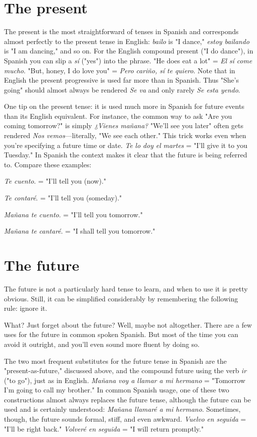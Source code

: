 \documentclass[14pt,a4paper,oneside]{memoir}
\newcommand{\bsk}{\vspace{20pt}}
\newcommand{\indu}{\hspace{20pt}}
\begin{document}
\section{The present}

The present is the most straightforward of tenses in Spanish
and corresponds almost perfectly to the present tense in English: \emph{bailo}
is "I dance," \emph{estoy bailando} is "I am dancing," and so on. For the English compound present ("I do dance"), in Spanish you can slip a \emph{sí}
("yes") into the phrase. "He does eat a lot" = \emph{El sí come mucho}. "But,
honey, I do love you" = \emph{Pero cariño, sí te quiero}. Note that in English
the present progressive is used far more than in Spanish. Thus "She's
going" should almost always be rendered \emph{Se va} and only rarely \emph{Se esta
	yendo}.

One tip on the present tense: it is used much more in Spanish
for future events than its English equivalent. For instance, the common way to ask "Are you coming tomorrow?" is simply \emph{¿Vienes mañana?} "We'll see you later" often gets rendered \emph{Nos vemos}---literally,
"We see each other." This trick works even when you're specifying a
future time or date. \emph{Te lo doy el martes} = "I'll give it to you Tuesday."
In Spanish the context makes it clear that the future is being referred
to. Compare these examples:

\bsk

\indu \emph{Te cuento}. = "I'll tell you (now)."

\indu \emph{Te contaré}. = "I'll tell you (someday)."

\indu \emph{Mañana te cuento}. = "I'll tell you tomorrow."

\indu \emph{Mañana te cantaré}. = "I shall tell you tomorrow."

\section{The future}

The future is not a particularly hard tense to learn, and when
to use it is pretty obvious. Still, it can be simplified considerably by
remembering the following rule: ignore it.

What? Just forget about the future? Well, maybe not altogether. There are a few uses for the future in common spoken Spanish.
But most of the time you can avoid it outright, and you'll even sound
more fluent by doing so.

The two most frequent substitutes for the future tense in
Spanish are the "present-as-future," discussed above, and the compound future using the verb \emph{ir} ("to go"), just as in English. \emph{Mañana voy
	a llamar a mi hermano} = "Tomorrow I'm going to call my brother."
In common Spanish usage, one of these two constructions almost always replaces the future tense, although the future can be used and is
certainly understood: \emph{Mañana llamaré a mi hermano}. Sometimes,
though, the future sounds formal, stiff, and even awkward. \emph{Vuelvo en
	seguida} = "I'll be right back." \emph{Volveré en seguida} = "I will return
promptly."
\end{document}
